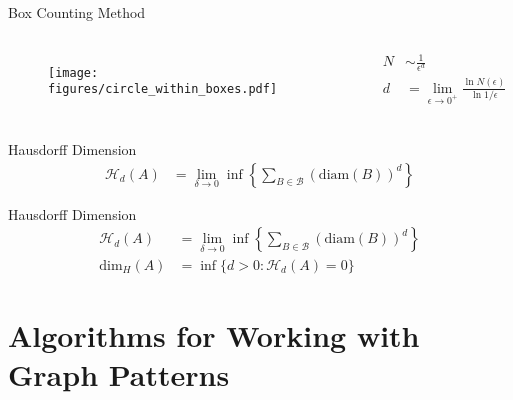 \documentclass[10pt]{beamer}
\begin{document}
\begin{frame}{Box Counting Method}
    \begin{columns}[c]
        \column{1.5in}
        \begin{figure}[h!]
            \centering
            \texttt{[image: figures/circle\_within\_boxes.pdf]}
        \end{figure}
        \column{1.5in}
            \begin{align*}
                N &\sim \frac{1}{\epsilon^d} \\
                d &= \lim_{\epsilon \to 0^+} \frac{\ln N(\epsilon)}{\ln 1 / \epsilon}
            \end{align*}
    \end{columns}
\end{frame}


\begin{frame}{Hausdorff Dimension}
    \begin{align*}
        \mathcal{H}_d (A) &= \lim_{\delta \to 0} \inf \left \{ \sum_{B \in \mathcal{B}} \left ( \text{diam}(B) \right)^d \right \}
    \end{align*}
\end{frame}

\begin{frame}{Hausdorff Dimension}
    \begin{align*}
        \mathcal{H}_d (A) &= \lim_{\delta \to 0} \inf \left \{ \sum_{B \in \mathcal{B}} \left ( \text{diam}(B) \right)^d \right \} \\
        \text{dim}_H (A) &= \inf \{ d > 0 : \mathcal{H}_d (A) = 0 \}
    \end{align*}
\end{frame}

\section{Algorithms for Working with Graph Patterns}
\end{document}
